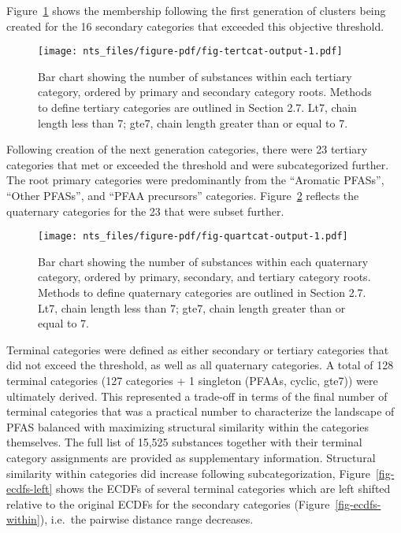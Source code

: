 \documentclass[
  super,
  preprint,
  3p]{elsarticle}
\begin{document}
Figure~\ref{fig-tertcat} shows the membership following the first
generation of clusters being created for the 16 secondary categories
that exceeded this objective threshold.

\begin{figure}

{\centering \texttt{[image: nts\_files/figure-pdf/fig-tertcat-output-1.pdf]}

}

\caption{\label{fig-tertcat}Bar chart showing the number of substances
within each tertiary category, ordered by primary and secondary category
roots. Methods to define tertiary categories are outlined in Section
2.7. Lt7, chain length less than 7; gte7, chain length greater than or
equal to 7.}

\end{figure}

Following creation of the next generation categories, there were 23
tertiary categories that met or exceeded the threshold and were
subcategorized further. The root primary categories were predominantly
from the ``Aromatic PFASs'', ``Other PFASs'', and ``PFAA precursors''
categories. Figure~\ref{fig-quartcat} reflects the quaternary categories
for the 23 that were subset further.

\begin{figure}

{\centering \texttt{[image: nts\_files/figure-pdf/fig-quartcat-output-1.pdf]}

}

\caption{\label{fig-quartcat}Bar chart showing the number of substances
within each quaternary category, ordered by primary, secondary, and
tertiary category roots. Methods to define quaternary categories are
outlined in Section 2.7. Lt7, chain length less than 7; gte7, chain
length greater than or equal to 7.}

\end{figure}

Terminal categories were defined as either secondary or tertiary
categories that did not exceed the threshold, as well as all quaternary
categories. A total of 128 terminal categories (127 categories + 1
singleton (PFAAs, cyclic, gte7)) were ultimately derived. This
represented a trade-off in terms of the final number of terminal
categories that was a practical number to characterize the landscape of
PFAS balanced with maximizing structural similarity within the
categories themselves. The full list of 15,525 substances together with
their terminal category assignments are provided as supplementary
information. Structural similarity within categories did increase
following subcategorization, Figure~\ref{fig-ecdfs-left} shows the ECDFs
of several terminal categories which are left shifted relative to the
original ECDFs for the secondary categories
(Figure~\ref{fig-ecdfs-within}), i.e.~the pairwise distance range
decreases.
\end{document}
